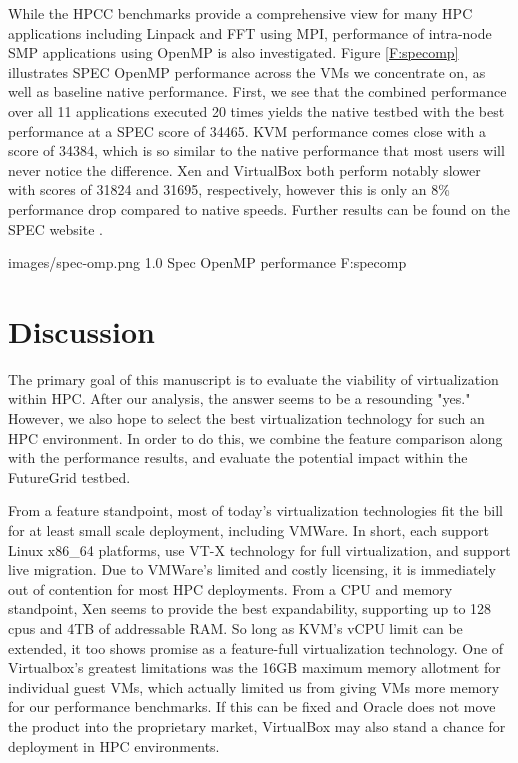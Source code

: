 While the HPCC benchmarks provide a comprehensive view for many HPC applications including Linpack and FFT using MPI, performance of intra-node SMP applications using OpenMP is also investigated.  Figure \ref{F:specomp} illustrates SPEC OpenMP performance across the VMs we concentrate on, as well as baseline native performance.  First, we see that the combined performance over all 11 applications executed 20 times yields the native testbed with the best performance at a SPEC score of 34465.  KVM performance comes close with a score of 34384, which is so similar to the native performance that most users will never notice the difference.  Xen and VirtualBox both perform notably slower with scores of 31824 and 31695, respectively, however this is only an 8\% performance drop compared to native speeds. Further results can be found on the SPEC website \cite{spec2011}. 

  {images/spec-omp.png}
  {1.0}
  {Spec OpenMP performance}
  {F:specomp}

\section{Discussion}

The primary goal of this manuscript is to evaluate the viability of virtualization within HPC.  After our analysis, the answer seems to be a resounding "yes."  However, we also hope to select the best virtualization technology for such an HPC environment.  In order to do this, we combine the feature comparison along with the performance results, and evaluate the potential impact within the FutureGrid testbed.    

From a feature standpoint, most of today's virtualization technologies fit the bill for at least small scale deployment, including VMWare.  In short, each support Linux x86\_64 platforms, use VT-X technology for full virtualization, and support live migration.  Due to VMWare's limited and costly licensing, it is immediately out of contention for most HPC deployments.  From a CPU and memory standpoint, Xen seems to provide the best expandability, supporting up to 128 cpus and 4TB of addressable RAM.  So long as KVM's vCPU limit can be extended, it too shows promise as a feature-full virtualization technology.  One of Virtualbox's greatest limitations was the 16GB maximum memory allotment for individual guest VMs, which actually limited us from giving VMs more memory for our performance benchmarks. If this can be fixed and Oracle does not move the product into the proprietary market, VirtualBox may also stand a chance for deployment in HPC environments.  



